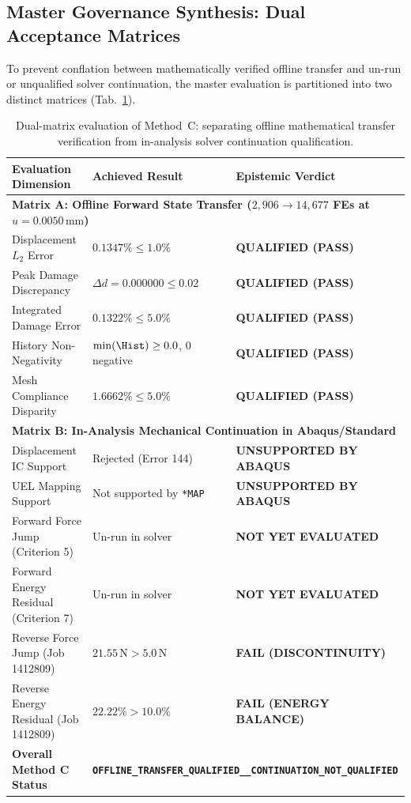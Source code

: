 \begin{enumerate}
\subsection{Master Governance Synthesis: Dual Acceptance Matrices}
\label{subsec:method_c_governance_synthesis}

To prevent conflation between mathematically verified offline transfer and un-run or unqualified solver continuation, the master evaluation is partitioned into two distinct matrices (Tab.~\ref{tab:method_c_dual_matrix}).

\begin{table}[htbp]
\centering
\caption{Dual-matrix evaluation of Method~C: separating offline mathematical transfer verification from in-analysis solver continuation qualification.}
\label{tab:method_c_dual_matrix}
\small
\begin{tabular}{p{}p{}p{}}
\hline
\textbf{Evaluation Dimension} & \textbf{Achieved Result} & \textbf{Epistemic Verdict} \\
\hline
\multicolumn{3}{l}{\textbf{Matrix A: Offline Forward State Transfer ($2{,}906 \to 14{,}677$ FEs at $u = 0.0050\,\mathrm{mm}$)}} \\
\hline
Displacement $L_2$ Error & $0.1347\% \le 1.0\%$ & \textbf{QUALIFIED (PASS)} \\
Peak Damage Discrepancy & $\Delta d = 0.000000 \le 0.02$ & \textbf{QUALIFIED (PASS)} \\
Integrated Damage Error & $0.1322\% \le 5.0\%$ & \textbf{QUALIFIED (PASS)} \\
History Non-Negativity & $\min(\Hist) \ge 0.0$, $0$ negative & \textbf{QUALIFIED (PASS)} \\
Mesh Compliance Disparity & $1.6662\% \le 5.0\%$ & \textbf{QUALIFIED (PASS)} \\
\hline
\multicolumn{3}{l}{\textbf{Matrix B: In-Analysis Mechanical Continuation in Abaqus/Standard}} \\
\hline
Displacement IC Support & Rejected (Error 144) & \textbf{UNSUPPORTED BY ABAQUS} \\
UEL Mapping Support & Not supported by \texttt{*MAP} & \textbf{UNSUPPORTED BY ABAQUS} \\
Forward Force Jump (Criterion 5) & Un-run in solver & \textbf{NOT YET EVALUATED} \\
Forward Energy Residual (Criterion 7) & Un-run in solver & \textbf{NOT YET EVALUATED} \\
Reverse Force Jump (Job 1412809) & $21.55\,\mathrm{N} > 5.0\,\mathrm{N}$ & \textbf{FAIL (DISCONTINUITY)} \\
Reverse Energy Residual (Job 1412809) & $22.22\% > 10.0\%$ & \textbf{FAIL (ENERGY BALANCE)} \\
\hline
\textbf{Overall Method C Status} & \multicolumn{2}{l}{\textbf{\texttt{OFFLINE\_TRANSFER\_QUALIFIED\_\_CONTINUATION\_NOT\_QUALIFIED}}} \\
\hline
\end{tabular}
\end{table}


\end{enumerate}
